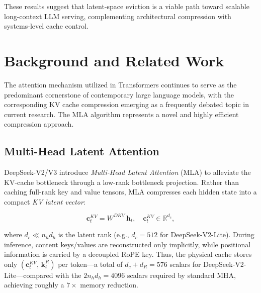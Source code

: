 \documentclass[letterpaper]{article} %
\begin{document}
These results suggest that latent-space eviction is a viable path toward scalable long-context LLM serving, complementing architectural compression with systems-level cache control.


\section{Background and Related Work}

The attention mechanism utilized in Transformers continues to serve as the predominant cornerstone of contemporary large language models, with the corresponding KV cache compression emerging as a frequently debated topic in current research. The MLA algorithm represents a novel and highly efficient compression approach.

\subsection{Multi-Head Latent Attention}

DeepSeek-V2/V3 \cite{deepseekv2,deepseekv3} introduce \emph{Multi-Head Latent
Attention} (MLA) to alleviate the KV-cache bottleneck through a low-rank
bottleneck projection. Rather than caching full-rank key and value tensors, MLA
compresses each hidden state into a compact \emph{KV latent vector}:

\begin{equation}
  \mathbf{c}_{t}^{KV} = W^{DKV}\,\mathbf{h}_t,
    \quad \mathbf{c}_{t}^{KV} \in \mathbb{R}^{d_c},
  \label{eq:kv_compress}
\end{equation}

where $d_c \ll n_h d_h$ is the latent rank (e.g., $d_c\!=\!512$ for
DeepSeek-V2-Lite). During inference, content keys/values are reconstructed only
implicitly, while positional information is carried by a decoupled RoPE key.
Thus, the physical cache stores only
$(\mathbf{c}_{t}^{KV},\,\mathbf{k}_{t}^{R})$ per token—a total of
$d_c + d_R = 576$ scalars for DeepSeek-V2-Lite—compared with the
$2n_h d_h = 4096$ scalars required by standard MHA, achieving roughly a
$7\times$ memory reduction.
\end{document}
